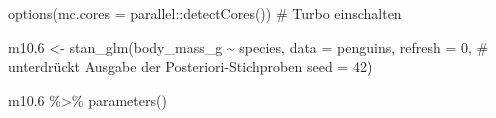 \documentclass[
  a4paper,
  DIV=11]{scrreprt}
\newenvironment{Shaded}{\begin{snugshade}}{\end{snugshade}}
\newcommand{\AttributeTok}[1]{\textcolor[rgb]{0.40,0.45,0.13}{#1}}
\newcommand{\CommentTok}[1]{\textcolor[rgb]{0.37,0.37,0.37}{#1}}
\newcommand{\DecValTok}[1]{\textcolor[rgb]{0.68,0.00,0.00}{#1}}
\newcommand{\FloatTok}[1]{\textcolor[rgb]{0.68,0.00,0.00}{#1}}
\newcommand{\FunctionTok}[1]{\textcolor[rgb]{0.28,0.35,0.67}{#1}}
\newcommand{\NormalTok}[1]{\textcolor[rgb]{0.00,0.23,0.31}{#1}}
\newcommand{\OtherTok}[1]{\textcolor[rgb]{0.00,0.23,0.31}{#1}}
\newcommand{\SpecialCharTok}[1]{\textcolor[rgb]{0.37,0.37,0.37}{#1}}
\theoremstyle{definition}
\theoremstyle{remark}
\begin{document}
\begin{Shaded}
\begin{Highlighting}[]
\FunctionTok{options}\NormalTok{(}\AttributeTok{mc.cores =}\NormalTok{ parallel}\SpecialCharTok{::}\FunctionTok{detectCores}\NormalTok{())  }\CommentTok{\# Turbo einschalten}

\NormalTok{m10}\FloatTok{.6} \OtherTok{\textless{}{-}} \FunctionTok{stan\_glm}\NormalTok{(body\_mass\_g }\SpecialCharTok{\textasciitilde{}}\NormalTok{ species, }
                  \AttributeTok{data =}\NormalTok{ penguins, }
                  \AttributeTok{refresh =} \DecValTok{0}\NormalTok{,  }\CommentTok{\# unterdrückt Ausgabe der Posteriori{-}Stichproben}
                  \AttributeTok{seed =} \DecValTok{42}\NormalTok{)}


\NormalTok{m10}\FloatTok{.6} \SpecialCharTok{\%\textgreater{}\%} 
  \FunctionTok{parameters}\NormalTok{()}
\end{Highlighting}
\end{Shaded}
\end{document}
